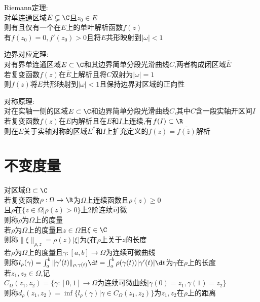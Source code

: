 \begin{dingli}
Riemann定理:\\
对单连通区域$E\subsetneq \C$且$z_0\in E$\\
则有且仅有一个在$E$上的单叶解析函数$f(z)$\\
有$f(z_0)=0,f'(z_0)> 0$且将$E$共形映射到$|\omega|<1$
\end{dingli}

\begin{dingli}
边界对应定理:\\
对有界单连通区域$E\subset \C$和其边界简单分段光滑曲线$C$,两者构成闭区域$\overline{E}$\\
若复变函数$f(z)$在$\overline{E}$上解析且将$C$双射为$|\omega|=1$\\
则$f(z)$将$E$共形映射到$|\omega|<1$且保持边界对区域的正向性
\end{dingli}

\begin{dingli}
对称原理:\\
对在实轴一侧的区域$E\subset \C$和边界简单分段光滑曲线$C$,其中$C$含一段实轴开区间$I$\\
若复变函数$f(z)$在$E$内解析且在$E$和$I$上连续,有$f(I)\subset\R$\\
则在$E$关于实轴对称的区域$E^*$和$I$上扩充定义的$f(z)=\overline{f(\overline{z})}$解析
\end{dingli}

\chapter{不变度量}

\begin{dingyi}
对区域$\Omega\subset\C$\\
若复变函数$\rho:\Omega\to\R$为$\Omega$上连续函数且$\rho(z)\geq 0$\\
且$\rho$在$\{z\in\Omega|\rho(z)>0\}$上$2$阶连续可微\\
则称$\rho$为$\Omega$上的度量\\
若$\rho$为$\Omega$上的度量且$z\in\Omega$且$\xi\in\C$\\
则称$\|\xi\|_{\rho,z}=\rho(z)|\xi|$为$\xi$在$\rho$上关于$z$的长度\\
若$\rho$为$\Omega$上的度量且$\gamma:[a,b]\to\Omega$为连续可微曲线\\
则称$l_{\rho}(\gamma)=\int_{a}^{b}\|\gamma'(t)\|_{\rho,\gamma(t)}\d t=\int_{a}^{b}\rho(\gamma(t))|\gamma'(t)|\d t$为$\gamma$在$\rho$上的长度\\
若$z_1,z_2\in\Omega$,记$C_{\Omega}(z_1,z_2)=\{\gamma:[0,1]\to\Omega\text{为连续可微曲线}|\gamma(0)=z_1,\gamma(1)=z_2\}$\\
则称$d_{\rho}(z_1,z_2)=\inf\{l_{\rho}(\gamma)|\gamma\in C_{\Omega}(z_1,z_2)\}$为$z_1,z_2$在$\rho$上的距离
\end{dingyi}

